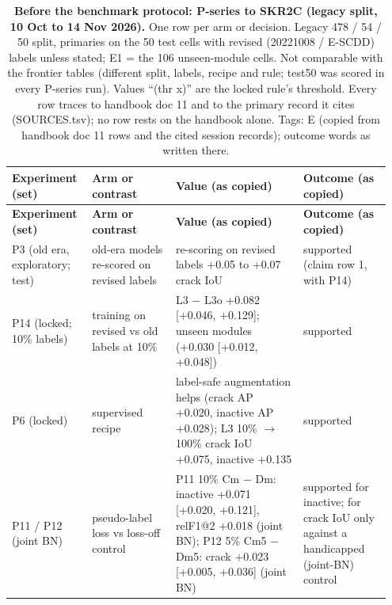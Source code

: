 \clearpage
\begingroup
\footnotesize
\setlength{\tabcolsep}{3pt}
\setlength{\LTcapwidth}{\linewidth}
\begin{longtable}{@{}>{\raggedright\arraybackslash\hspace{0pt}}p{0.191\linewidth}>{\raggedright\arraybackslash\hspace{0pt}}p{0.210\linewidth}>{\raggedright\arraybackslash\hspace{0pt}}p{0.324\linewidth}>{\raggedright\arraybackslash\hspace{0pt}}p{0.229\linewidth}@{}}
\caption[Before the benchmark protocol: P-series to SKR2C (legacy split, 10 Oct to 14 Nov 2026)]{\textbf{Before the benchmark protocol: P-series to SKR2C (legacy split, 10 Oct to 14 Nov 2026).} One row per arm or decision. Legacy 478 / 54 / 50 split, primaries on the 50 test cells with revised (20221008 / E-SCDD) labels unless stated; E1 = the 106 unseen-module cells. Not comparable with the frontier tables (different split, labels, recipe and rule; test50 was scored in every P-series run). Values ``(thr x)'' are the locked rule's threshold. Every row traces to handbook doc 11 and to the primary record it cites (SOURCES.tsv); no row rests on the handbook alone. Tags: E (copied from handbook doc 11 rows and the cited session records); outcome words as written there.}
\label{tab:T21}\\
\toprule
\textbf{Experiment (set)} & \textbf{Arm or contrast} & \textbf{Value (as copied)} & \textbf{Outcome (as copied)} \\
\midrule
\endfirsthead
\toprule
\textbf{Experiment (set)} & \textbf{Arm or contrast} & \textbf{Value (as copied)} & \textbf{Outcome (as copied)} \\
\midrule
\endhead
P3 (old era, exploratory; test) & old-era models re-scored on revised labels & re-scoring on revised labels +0.05 to +0.07 crack IoU & supported (claim row 1, with P14) \\
P14 (locked; 10\% labels) & training on revised vs old labels at 10\% & L3 $-$ L3o +0.082 [+0.046, +0.129]; unseen modules (+0.030 [+0.012, +0.048]) & supported \\
P6 (locked) & supervised recipe & label-safe augmentation helps (crack AP +0.020, inactive AP +0.028); L3 10\% $\rightarrow$ 100\% crack IoU +0.075, inactive +0.135 & supported \\
P11 / P12 (joint BN) & pseudo-label loss vs loss-off control & P11 10\% Cm $-$ Dm: inactive +0.071 [+0.020, +0.121], relF1@2 +0.018 (joint BN); P12 5\% Cm5 $-$ Dm5: crack +0.023 [+0.005, +0.036] (joint BN) & supported for inactive; for crack IoU only against a handicapped (joint-BN) control \\

\end{longtable}
